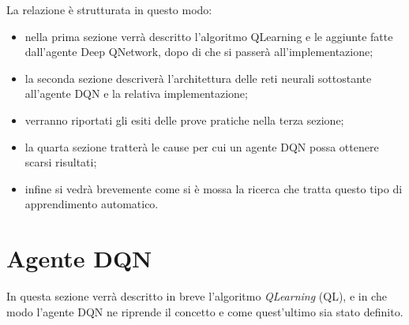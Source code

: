 \documentclass[twoside,twocolumn,10pt]{extarticle}
\theoremstyle{definition}
\begin{document}
	La relazione è strutturata in questo modo:
	\begin{itemize}
		\item nella prima sezione verrà descritto l'algoritmo Q\texttwelveudash Learning e le aggiunte fatte dall'agente Deep Q\texttwelveudash Network, dopo di che si passerà all'implementazione;
		\item la seconda sezione descriverà l'architettura delle reti neurali sottostante all'agente DQN e la relativa implementazione;
		\item verranno riportati gli esiti delle prove pratiche nella terza sezione;
		\item la quarta sezione tratterà le cause per cui un agente DQN possa ottenere scarsi risultati;
		\item infine si vedrà brevemente come si è mossa la ricerca che tratta questo tipo di apprendimento automatico.
	\end{itemize}
	
\section{Agente DQN}\label{sec:dqn-agent}
	In questa sezione verrà descritto in breve l'algoritmo \textit{Q\texttwelveudash Learning} (QL), e in che modo l'agente DQN ne riprende il concetto e come quest'ultimo sia stato definito.
\end{document}
